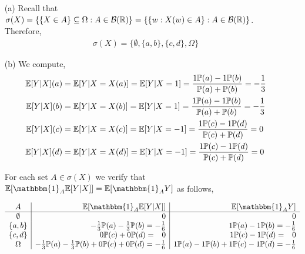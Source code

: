 \documentclass[10pt]{article}
\begin{document}
\begin{solution}[Solution]
\begin{enumerate}
    \item[(a)] Recall that \( \sigma(X) = \{ \{X\in A\}\subseteq\Omega : A\in\mathcal{B}(\mathbb{R}) \} = \{\{w : X(w)\in A\} : A\in\mathcal{B}(\mathbb{R})\} \). Therefore,
        \begin{align*}
            \sigma(X) = \{ \emptyset,\{a,b\},\{c,d\}, \Omega \}
        \end{align*}
    \item[(b)] We compute, 
        \begin{align*}
            \mathbb{E}[Y|X](a) &= \mathbb{E}[Y|X=X(a)] = \mathbb{E}[Y|X=1] = \dfrac{1\mathbb{P}(a)-1\mathbb{P}(b)}{\mathbb{P}(a)+\mathbb{P}(b)} = -\dfrac{1}{3} \\
            \mathbb{E}[Y|X](b) &= \mathbb{E}[Y|X=X(b)] = \mathbb{E}[Y|X=1] = \dfrac{1\mathbb{P}(a)-1\mathbb{P}(b)}{\mathbb{P}(a)+\mathbb{P}(b)} = -\dfrac{1}{3} \\ 
            \mathbb{E}[Y|X](c) &= \mathbb{E}[Y|X=X(c)] = \mathbb{E}[Y|X=-1] = \dfrac{1\mathbb{P}(c)-1\mathbb{P}(d)}{\mathbb{P}(c)+\mathbb{P}(d)} = 0 \\
            \mathbb{E}[Y|X](d) &= \mathbb{E}[Y|X=X(d)] = \mathbb{E}[Y|X=-1] = \dfrac{1\mathbb{P}(c)-1\mathbb{P}(d)}{\mathbb{P}(c)+\mathbb{P}(d)} = 0 \\
        \end{align*}

        For each set \( A\in\sigma(X) \) we verify that \( \EE[\mathbbm{1}_A\EE[Y|X]]=\EE[\mathbbm{1}_A Y] \) as follows,        
        
        \begin{align*}
        \begin{array}{c|r|r}
             A  &  \EE[\mathbbm{1}_A\EE[Y|X]]  & \EE[\mathbbm{1}_AY]  \\ \hline   
             \emptyset  & 0 & 0 \\
             \{a,b\}  &  -\frac{1}{3}\PP(a)-\frac{1}{3}\PP(b) = -\frac{1}{6}  &  1\PP(a)-1\PP(b) = -\frac{1}{6}  \\
             \{c,d\}  &  0\PP(c)+0\PP(d) =\phantom{-} 0  &  1\PP(c)-1\PP(d) =\phantom{-} 0  \\
             \Omega  &  -\frac{1}{3}\PP(a)-\frac{1}{3}\PP(b)+0\PP(c)+0\PP(d) = -\frac{1}{6}  &  1\PP(a)-1\PP(b)+1\PP(c)-1\PP(d) = -\frac{1}{6}               \end{array}
        \end{align*}


\end{enumerate}
\end{solution}
\end{document}
